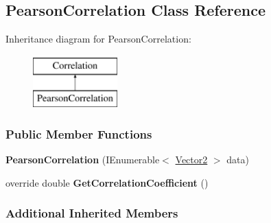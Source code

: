 \hypertarget{classDataTools_1_1correlation_1_1PearsonCorrelation}{}\subsection{Pearson\+Correlation Class Reference}
\label{classDataTools_1_1correlation_1_1PearsonCorrelation}
Inheritance diagram for Pearson\+Correlation\+:\begin{figure}[H]
\begin{center}
\leavevmode
\includegraphics[height=2.000000cm]{classDataTools_1_1correlation_1_1PearsonCorrelation}
\end{center}
\end{figure}
\subsubsection*{Public Member Functions}
\begin{DoxyCompactItemize}
\item 
\mbox{\label{classDataTools_1_1correlation_1_1PearsonCorrelation_afaeef6d70f6c46171dbd457e3c61c0b8}} 
{\bfseries Pearson\+Correlation} (I\+Enumerable$<$ \hyperlink{classDataTools_1_1Vector2}{Vector2} $>$ data)
\item 
\mbox{\label{classDataTools_1_1correlation_1_1PearsonCorrelation_afff258bf05afa59c8fd4118e650e1682}} 
override double {\bfseries Get\+Correlation\+Coefficient} ()
\end{DoxyCompactItemize}
\subsubsection*{Additional Inherited Members}
